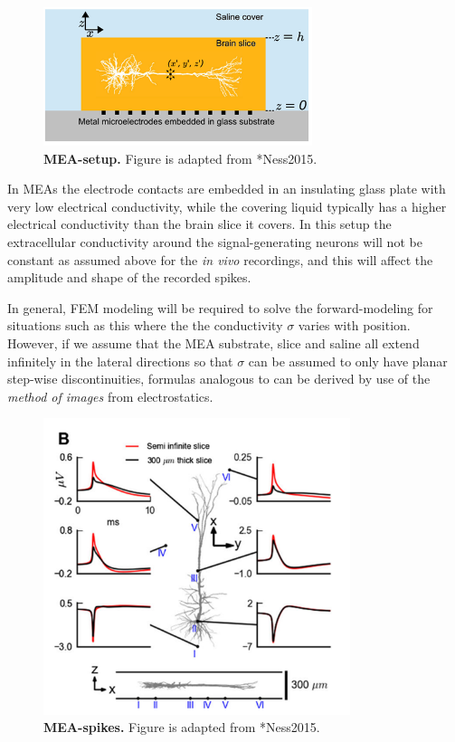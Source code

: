 \begin{figure}[!ht]
\begin{center}
\includegraphics[width=0.7\textwidth]{Figures/Spikes/Spikes-MEA-1-w43-r300}
\end{center}
\caption[]{\textbf{MEA-setup.}
Figure is adapted from \citeasnoun**{Ness2015}.}
\label{fig:Spikes:MEA-setup}
\end{figure}

In MEAs the electrode contacts are embedded in an insulating glass plate with very 
low electrical conductivity, while the covering liquid typically has a higher electrical conductivity 
than the brain slice it covers. In this setup the extracellular conductivity around the signal-generating neurons
will not be constant as assumed above for the \textit{in vivo} recordings, and this will affect the amplitude and shape of the recorded spikes. 

In general, FEM modeling will be required to solve the forward-modeling for situations such as this where
the the conductivity $\sigma$ varies with position. However, if we assume that the MEA substrate, slice and saline
all extend infinitely in the lateral directions so that $\sigma$ can be assumed to only have planar step-wise discontinuities, 
formulas analogous to  can be derived by use of the \emph{method of images} from electrostatics. 


\begin{figure}[!ht]
\begin{center}
\includegraphics[width=0.8\textwidth]{Figures/Spikes/Spikes-MEA-2-w43-r300}
\end{center}
\caption[]{\textbf{MEA-spikes.}
Figure is adapted from \citeasnoun**{Ness2015}.}
\label{fig:Spikes:MEA-spikes}
\end{figure}

